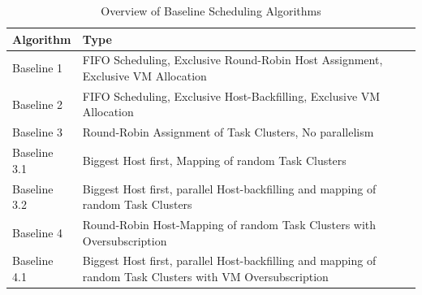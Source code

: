\begin{table}[H]
    \centering
    \footnotesize
    \begin{tabularx}{\textwidth}{l p{10cm}}
        \toprule
        \textbf{Algorithm} & \textbf{Type}                                                                                              \\
        \midrule
        Baseline 1         & FIFO Scheduling, Exclusive Round-Robin Host Assignment, Exclusive VM Allocation                            \\
        Baseline 2         & FIFO Scheduling, Exclusive Host-Backfilling, Exclusive VM Allocation                                       \\
        Baseline 3         & Round-Robin Assignment of Task Clusters, No parallelism                                                    \\
        Baseline 3.1       & Biggest Host first, Mapping of random Task Clusters                                                        \\
        Baseline 3.2       & Biggest Host first, parallel Host-backfilling and mapping of random Task Clusters                          \\
        Baseline 4         & Round-Robin Host-Mapping of random Task Clusters with Oversubscription                                     \\
        Baseline 4.1       & Biggest Host first, parallel Host-backfilling and mapping of random Task Clusters with VM Oversubscription \\
        \bottomrule
    \end{tabularx}
    \small
    \caption{Overview of Baseline Scheduling Algorithms}
    \label{tab:baselines_overview}
\end{table}

